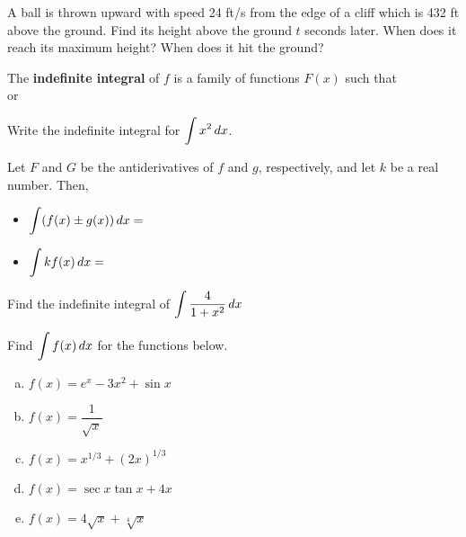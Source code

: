 \documentclass[notes]{subfiles}
\begin{document}
		\begin{ex}
			A ball is thrown upward with speed 24 ft/s from the edge of a cliff which is 432 ft above the ground.  Find its height above the ground \(t\) seconds later.  When does it reach its maximum height?  When does it hit the ground?
		\end{ex}
			
		\begin{defn}
			The \textbf{indefinite integral} of \(f\) is a family of functions \(F(x)\) such that
			$ $\\[25pt] or 
		\end{defn}
		
		\begin{ex}
			Write the indefinite integral for \(\displaystyle \int x^2\,dx\).  
		\end{ex}
			\newpage
			
		\begin{rmk}
			Let \(F\) and \(G\) be the antiderivatives of \(f\) and \(g\), respectively, and let \(k\) be a real number. Then,\\[10pt]
			\begin{itemize}
				\setlength\itemsep{15pt}
				\item \(\displaystyle \int (f(x)\pm g(x))\, dx = \)
				\item \(\displaystyle \int kf(x)\, dx = \)
			\end{itemize}
		\end{rmk}
		
		\begin{ex}
			Find the indefinite integral of \(\displaystyle \int \dfrac{4}{1+x^2}\, dx\) 
		\end{ex}
			
		\begin{ex}
			Find \(\displaystyle \int f(x)\, dx\) for the functions below.
			\begin{enumerate}[(a)]
				\item \(f(x) = e^x -3x^2 + \sin x\)
					
				\item \(f(x) = \dfrac{1}{\sqrt{x}}\)
					\newpage
					
				\item \(f(x) = x^{1/3} + (2x)^{1/3}\)
					
				\item \(f(x) = \sec x\tan x + 4x\)
					
				\item \(f(x) = 4\sqrt{x} + \sqrt[4]{x}\)
			\end{enumerate}
		\end{ex}
		
\end{document}
